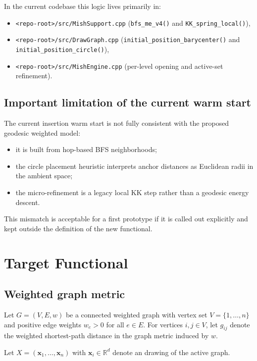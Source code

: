 \documentclass[11pt]{article}
\newcommand{\RR}{\mathbb{R}}
\newcommand{\filepath}[1]{\begingroup\urlstyle{tt}\nolinkurl{#1}\endgroup}
\newcommand{\code}[1]{\begingroup\urlstyle{tt}\nolinkurl{#1}\endgroup}
\newcommand{\vect}[1]{\mathbf{#1}}
\begin{document}
In the current codebase this logic lives primarily in:
\begin{itemize}[leftmargin=1.4em]
  \item \filepath{<repo-root>/src/MishSupport.cpp}
    (\code{bfs\_me\_v4()} and \code{KK\_spring\_local()}),
  \item \filepath{<repo-root>/src/DrawGraph.cpp}
    (\code{initial\_position\_barycenter()} and
    \code{initial\_position\_circle()}),
  \item \filepath{<repo-root>/src/MishEngine.cpp}
    (per-level opening and active-set refinement).
\end{itemize}

\subsection{Important limitation of the current warm start}

The current insertion warm start is not fully consistent with the proposed
geodesic weighted model:
\begin{itemize}[leftmargin=1.4em]
  \item it is built from hop-based BFS neighborhoods;
  \item the circle placement heuristic interprets anchor distances as Euclidean
    radii in the ambient space;
  \item the micro-refinement is a legacy local KK step rather than a geodesic
    energy descent.
\end{itemize}

This mismatch is acceptable for a first prototype if it is called out
explicitly and kept outside the definition of the new functional.

\section{Target Functional}

\subsection{Weighted graph metric}

Let $G=(V,E,w)$ be a connected weighted graph with vertex set
$V=\{1,\dots,n\}$ and positive edge weights $w_e > 0$ for all $e \in E$.
For vertices $i,j \in V$, let $g_{ij}$ denote the weighted shortest-path
distance in the graph metric induced by $w$.

Let $X = (\vect{x}_1,\dots,\vect{x}_n)$ with $\vect{x}_i \in \RR^d$ denote an
drawing of the active graph.
\end{document}
